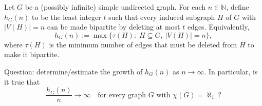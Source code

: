 Let $G$ be a (possibly infinite) simple undirected graph.  For each $n\in\mathbb N$, define $h_G(n)$ to be the least integer $t$ such that every induced subgraph $H$ of $G$ with $|V(H)|=n$ can be made bipartite by deleting at most $t$ edges.
Equivalently,
\[
 h_G(n):=\max\{\tau(H):\;H\subseteq G,\ |V(H)|=n\},
\]
where $\tau(H)$ is the minimum number of edges that must be deleted from $H$ to make it bipartite.

Question: determine/estimate the growth of $h_G(n)$ as $n\to\infty$.  In particular, is it true that
\[
\frac{h_G(n)}{n}\to\infty\quad\text{for every graph $G$ with }\chi(G)=\aleph_1\ ?
\]
